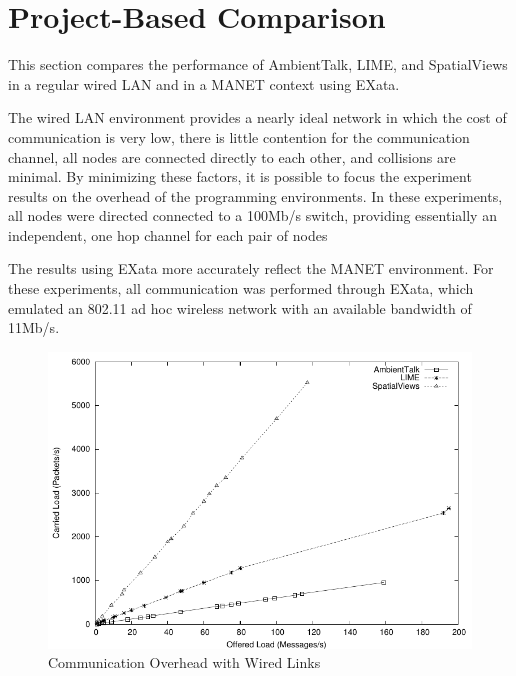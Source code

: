\section{Project-Based Comparison}\label{sec:proj_eval}

This section compares the performance of AmbientTalk, LIME, and SpatialViews in a regular wired LAN and in a MANET context using EXata.

The wired LAN environment provides a nearly ideal network in which the cost of communication is very low, there is little contention for the communication channel, all nodes are connected directly to each other, and collisions are minimal. By minimizing these factors, it is possible to focus the experiment results on the overhead of the programming environments. In these experiments, all nodes were directed connected to a 100Mb/s switch, providing essentially an independent, one hop channel for each pair of nodes

The results using EXata more accurately reflect the MANET environment. For these experiments, all communication was performed through EXata, which emulated an 802.11 ad hoc wireless network with an available bandwidth of 11Mb/s.

\begin{figure}
\includegraphics[scale = .70]{figures/overhead-wired.pdf}
\caption{Communication Overhead with Wired Links}
\label{fig:overhead-wired}
\end{figure}

